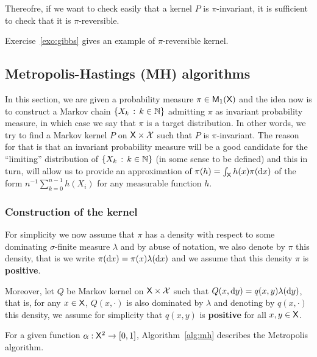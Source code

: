 \documentclass[english,graybox,envcountchap,envcountsame,sectrefs,shortlabels]{svmono}
\theoremstyle{style}
\begin{document}
Thereofre, if we want to check easily that
a kernel $P$ is $\pi$-invariant, it is sufficient to check that
it is $\pi$-reversible.


Exercise~\ref{exo:gibbs} gives an example of $\pi$-reversible kernel.

\subsection{Metropolis-Hastings (MH) algorithms}
\label{sec:MH}
In this section, we are given a probability measure $\pi\in\mathsf{M}_{1}(\mathsf{X})$
and the idea now is to construct a Markov chain $\left\{ X_{k}\,:\,k\in\mathbb{N}\right\}$
admitting $\pi$ as invariant probability measure, in which case we
say that $\pi$ is a target distribution. In other words, we try to
find a Markov kernel $P$ on $\mathsf{X}\times\mathcal{X}$ such that $P$
is $\pi$-invariant. The reason for that is that an invariant probability
measure will be a good candidate for the ``limiting'' distribution
of $\left\{ X_{k}\,:\,k\in\mathbb{N}\right\}$ (in some sense to be defined) and this
in turn, will allow us to provide an approximation of $\pi(h)=\int_{\mathsf{X}}h(x)\pi(\mathrm{d} x)$ of the form $n^{-1}\sum_{k=0}^{n-1}h(X_{i})$ for any measurable function $h$. 


\subsubsection{Construction of the kernel\label{subsec:construc}}

For simplicity we now assume that $\pi$ has a density with respect
to some dominating $\sigma$-finite measure $\lambda$ and by abuse
of notation, we also denote by $\pi$ this density, that is we write
$\pi(\mathrm{d} x)=\pi(x)\lambda(\mathrm{d} x)$ and we assume that this density
$\pi$ is \textbf{positive}.

Moreover, let $Q$ be Markov kernel on $\mathsf{X}\times\mathcal{X}$ such
that $Q(x,\mathrm{d} y)=q(x,y)\lambda(\mathrm{d} y)$, that is, for any $x\in\mathsf{X}$,
$Q(x,\cdot)$ is also dominated by $\lambda$ and denoting by $q(x,\cdot)$
this density, we assume for simplicity that $q(x,y)$ is \textbf{positive}
for all $x,y\in\mathsf{X}$. 

For a given function $\alpha:\mathsf{X}^{2}\to[0,1]$,  Algorithm~\ref{alg:mh} describes the Metropolis algorithm.
\end{document}
